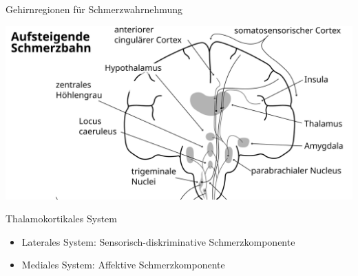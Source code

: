 \documentclass{beamer}
\begin{document}

\begin{frame}{Gehirnregionen für Schmerzwahrnehmung}
    
    \begin{center}
        \includegraphics[width=\textwidth]{Schmerz_aufsteigend_Gehirn.png}
    
    \end{center}
    
\end{frame}


\begin{frame}{Thalamokortikales System}
    
    \begin{itemize}
        \item 
        Laterales System: Sensorisch-diskriminative Schmerzkomponente
        \item
        Mediales System: Affektive Schmerzkomponente
    \end{itemize}
    
    
\end{frame}
\end{document}
